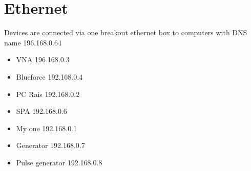 
\section{Ethernet}
Devices are connected via one  breakout ethernet box to computers with
DNS name 196.168.0.64
\begin{itemize}
\item VNA 196.168.0.3
\item Blueforce 192.168.0.4
\item PC Rais 192.168.0.2
\item SPA 192.168.0.6
\item My one 192.168.0.1
\item Generator 192.168.0.7
\item Pulse generator 192.168.0.8
\end{itemize}


\newpage
